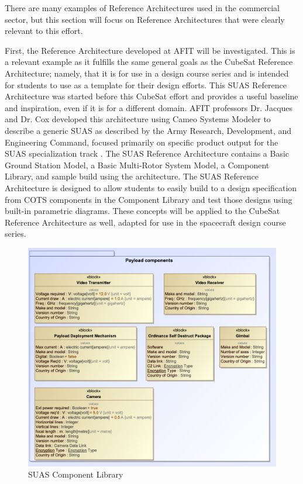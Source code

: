 There are many examples of Reference Architectures used in the commercial sector, but this section will focus on Reference Architectures that were clearly relevant to this effort. 

First, the  Reference Architecture developed at AFIT will be investigated. This is a relevant example as it fulfills the same general goals as the CubeSat Reference Architecture; namely, that it is for use in a design course series and is intended for students to use as a template for their design efforts. This SUAS Reference Architecture was started before this CubeSat effort and provides a useful baseline and inspiration, even if it is for a different domain. AFIT professors Dr. Jacques and Dr. Cox developed this architecture using Cameo Systems Modeler to describe a generic SUAS as described by the Army Research, Development, and Engineering Command, focused primarily on specific product output for the SUAS specialization track \citep{Jacques2019}. The SUAS Reference Architecture contains a Basic Ground Station Model, a Basic Multi-Rotor System Model, a Component Library, and sample build using the architecture.  The SUAS Reference Architecture is designed to allow students to easily build to a design specification from COTS components in the Component Library and test those designs using built-in parametric diagrams. These concepts will be applied to the CubeSat Reference Architecture as well, adapted for use in the spacecraft design course series. 
\begin{figure}[ht]
    \centering
    \includegraphics[width=\textwidth]{Thesis/Literature_Review/Lit Review Figures/suas component library.png}
    \caption{SUAS Component Library}
    \label{fig:SUAS Component Library}
\end{figure}



